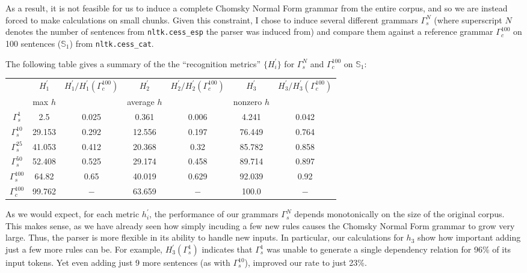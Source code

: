\documentclass[paper=a4, fontsize=11pt]{scrartcl} %
\newcommand{\gcat}{\Gamma_{c}}
\newcommand{\gesp}{\Gamma_{s}}
\begin{document}
As a result, it is not feasible for us to induce a complete Chomsky Normal Form grammar from the entire corpus, and so we are instead forced to make calculations on small chunks.  Given this constraint, I chose to induce several different grammars $\gesp^N$ (where superscript $N$ denotes the number of sentences from \texttt{nltk.cess\_esp} the parser was induced from) and compare them against a reference grammar $\gcat^{100}$ on 100 sentences ($\mathbb{S}_1$) from \texttt{nltk.cess\_cat}.

The following table gives a summary of the the ``recognition metrics'' $\{ H_i^\prime \}$ for $\gesp^N$ and $\gcat^{100}$ on $\mathbb{S}_1$:
\begin{center}
    \begin{tabular}{||c||cc|cc|cc||}
        \hline\hline
        & $H_1^\prime$ & $H_1^\prime/H_1^\prime(\gcat^{100})$ & $H_2^\prime$ & $H_2^\prime/H_2^\prime(\gcat^{100})$ & $H_3^\prime$ & $H_3^\prime/H_3^\prime(\gcat^{100})$ \\
        & max $h$ & & average $h$ & & nonzero $h$ & \\
        \hline\hline
        $\gesp^{1}$ & 2.5 & 0.025 & 0.361 & 0.006 & 4.241 & 0.042 \\ %
        $\gesp^{10}$ & 29.153 & 0.292 & 12.556 & 0.197 & 76.449 & 0.764 \\ %
        $\gesp^{25}$ & 41.053 & 0.412 & 20.368 & 0.32 & 85.782 & 0.858 \\ %
        $\gesp^{50}$ & 52.408 & 0.525 & 29.174 & 0.458 & 89.714 & 0.897 \\ %
        $\gesp^{100}$ & 64.82 & 0.65 & 40.019 & 0.629 & 92.039 & 0.92 \\ %
        \hline
		$\gcat^{100}$ & 99.762 & $-$ & 63.659 & $-$ & 100.0 & $-$ \\ %
        \hline\hline
    \end{tabular}
\end{center}

As we would expect, for each metric $h_i^\prime$, the performance of our grammars $\gesp^N$ depends monotonically on the size of the original corpus.  This makes sense, as we have already seen how simply incuding a few new rules causes the Chomsky Normal Form grammar to grow very large.  Thus, the parser is more flexible in its ability to handle new inputs.  In particular, our calculations for $h_3$ show how important adding just a few more rules can be.  For example, $H_3^\prime(\gesp^1)$ indicates that $\gesp^1$ was unable to generate a single dependency relation for 96\% of its input tokens.  Yet even adding just 9 more sentences (as with $\gesp^{10}$), improved our rate to just 23\%.
\end{document}
